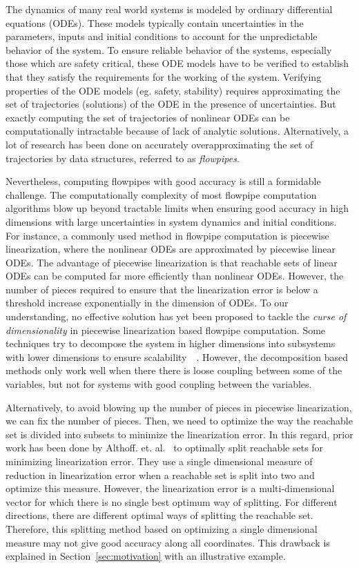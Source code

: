 The dynamics of many real world systems is modeled by ordinary
differential equations (ODEs).  These models typically contain
uncertainties in the parameters, inputs and initial conditions to
account for the unpredictable behavior of the system.  To ensure
reliable behavior of the systems, especially those which are safety
critical, these ODE models have to be verified to establish that they satisfy the
requirements for the working of the system.  Verifying properties of
the ODE models (eg. safety, stability) requires approximating the set
of trajectories (solutions) of the ODE in the presence of
uncertainties.  But exactly computing the set of trajectories of
nonlinear ODEs can be computationally intractable because of lack of
analytic solutions.  Alternatively, a lot of research has been done on
accurately overapproximating the set of trajectories by data
structures, referred to as \emph{flowpipes}.

Nevertheless, computing flowpipes with good accuracy is still a
formidable challenge.  The computationally complexity of most flowpipe
computation algorithms blow up beyond tractable limits when ensuring
good accuracy in high dimensions with large uncertainties in system
dynamics and initial conditions.  For instance, a commonly used method
in flowpipe computation is piecewise linearization, where the
nonlinear ODEs are approximated by piecewise linear ODEs.  The
advantage of piecewise linearization is that reachable sets of linear
ODEs can be computed far more efficiently than nonlinear ODEs.
However, the number of pieces required to ensure that the
linearization error is below a threshold increase exponentially in the
dimension of ODEs.  To our understanding, no effective solution has
yet been proposed to tackle the \emph{curse of dimensionality} in
piecewise linearization based flowpipe computation.  Some techniques
try to decompose the system in higher dimensions into subsystems with
lower dimensions to ensure
scalability~~\cite{chen2018decomposition,chen2016decomposed}.
However, the decomposition based methods only work well when there
there is loose coupling between some of the variables, but not for
systems with good coupling between the variables.

Alternatively, to avoid blowing up the number of pieces in piecewise
linearization, we can fix the number of pieces.  Then, we need to
optimize the way the reachable set is divided into subsets to minimize
the linearization error.  In this regard, prior work has been done by
Althoff. et. al.~\cite{althoff2008reachability} to optimally split
reachable sets for minimizing linearization error.  They use a single
dimensional measure of reduction in linearization error when a
reachable set is split into two and optimize this measure.  However,
the linearization error is a multi-dimensional vector for which there
is no single best optimum way of splitting.  For different directions,
there are different optimal ways of splitting the reachable set.
Therefore, this splitting method based on optimizing a single
dimensional measure may not give good accuracy along all coordinates.
This drawback is explained in Section~\ref{sec:motivation} with an illustrative
example.

